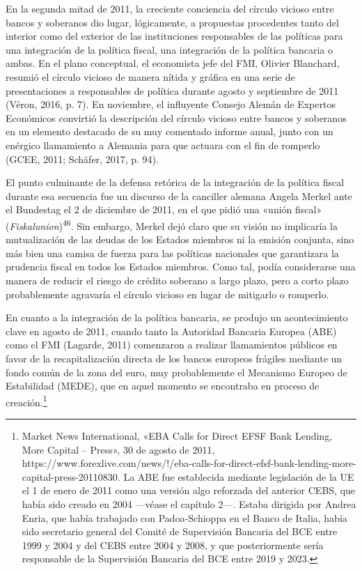 \documentclass[10pt,a4paper]{article}
\begin{document}
{En la segunda mitad de 2011, la creciente conciencia del círculo vicioso entre bancos y soberanos dio lugar, lógicamente, a propuestas procedentes tanto del interior como del exterior de las instituciones responsables de las políticas para una integración de la política fiscal, una integración de la política bancaria o ambas. En el plano conceptual, el economista jefe del FMI, Olivier Blanchard, resumió el círculo vicioso de manera nítida y gráfica en una serie de presentaciones a responsables de política durante agosto y septiembre de 2011 (Véron, 2016, p. 7). En noviembre, el influyente Consejo Alemán de Expertos Económicos convirtió la descripción del círculo vicioso entre bancos y soberanos en un elemento destacado de su muy comentado informe anual, junto con un enérgico llamamiento a Alemania para que actuara con el fin de romperlo (GCEE, 2011; Schäfer, 2017, p. 94).

El punto culminante de la defensa retórica de la integración de la política fiscal durante esa secuencia fue un discurso de la canciller alemana Angela Merkel ante el Bundestag el 2 de diciembre de 2011, en el que pidió una «unión fiscal» (\textit{Fiskalunion})\textsuperscript{46}. Sin embargo, Merkel dejó claro que su visión no implicaría la mutualización de las deudas de los Estados miembros ni la emisión conjunta, sino más bien una camisa de fuerza para las políticas nacionales que garantizara la prudencia fiscal en todos los Estados miembros. Como tal, podía considerarse una manera de reducir el riesgo de crédito soberano a largo plazo, pero a corto plazo probablemente agravaría el círculo vicioso en lugar de mitigarlo o romperlo.

En cuanto a la integración de la política bancaria, se produjo un acontecimiento clave en agosto de 2011, cuando tanto la Autoridad Bancaria Europea (ABE) como el FMI (Lagarde, 2011) comenzaron a realizar llamamientos públicos en favor de la recapitalización directa de los bancos europeos frágiles mediante un fondo común de la zona del euro, muy probablemente el Mecanismo Europeo de Estabilidad (MEDE), que en aquel momento se encontraba en proceso de creación.\footnote{%
    Market News International, «EBA Calls for Direct EFSF Bank Lending, More Capital – Press», 30 de agosto de 2011, https://www.forexlive.com/news/!/eba-calls-for-direct-efsf-bank-lending-more-capital-press-20110830. La ABE fue establecida mediante legislación de la UE el 1 de enero de 2011 como una versión algo reforzada del anterior CEBS, que había sido creado en 2004 —véase el capítulo 2—. Estaba dirigida por Andrea Enria, que había trabajado con Padoa-Schioppa en el Banco de Italia, había sido secretario general del Comité de Supervisión Bancaria del BCE entre 1999 y 2004 y del CEBS entre 2004 y 2008, y que posteriormente sería responsable de la Supervisión Bancaria del BCE entre 2019 y 2023.
}

}
\end{document}
